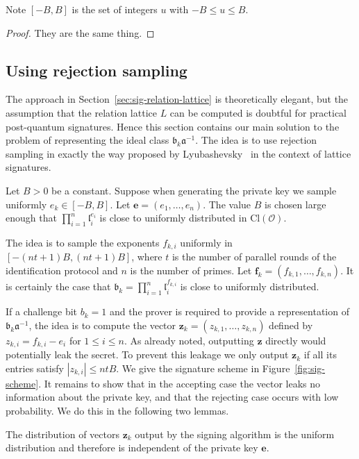\documentclass{llncs}
\newcommand{\OO}{\mathcal{O}}
\newcommand{\Cl}{\text{Cl}}
\renewcommand{\a}{\mathfrak{a}}
\renewcommand{\b}{\mathfrak{b}}
\renewcommand{\l}{\mathfrak{l}}
\newcommand{\e}{\textbf{e}}
\newcommand{\f}{\textbf{f}}
\newcommand{\z}{\textbf{z}}
\begin{document}
Note $[-B,B]$ is the set of integers $u$ with $-B \le u \le B$.


\begin{proof}
They are the same thing.
\end{proof}



\subsection{Using rejection sampling}\label{sec:sig-reject-sample}



The approach in Section~\ref{sec:sig-relation-lattice} is theoretically elegant, but the assumption that the relation lattice $L$ can be computed is doubtful for practical post-quantum signatures.
Hence this section contains our main solution to the problem of representing the ideal class $\b_k \a^{-1}$.
The idea is to use rejection sampling in exactly the way proposed by Lyubashevsky~\cite{Lyu09} in the context of lattice signatures.

Let $B > 0$ be a constant. Suppose when generating the private key we sample uniformly $e_k \in [-B, B]$. Let $\e = ( e_1, \dots, e_n )$.
The value $B$ is chosen large enough that $\prod_{i=1}^n \l_i^{e_i}$ is close to uniformly distributed in $\Cl(\OO)$.

The idea is to sample the exponents $f_{k,i}$ uniformly in $[-(nt+1)B, (nt+1)B]$, where $t$ is the number of parallel rounds of the identification protocol and $n$ is the number of primes.
Let $\f_k = (f_{k,1}, \dots, f_{k,n} )$.
It is certainly the case that $\b_k = \prod_{i=1}^n \l_i^{f_{k,i}}$ is close to uniformly distributed.

If a challenge bit $b_k = 1$ and the prover is required to provide a representation of $\b_k \a^{-1}$, the idea is to compute the vector $\z_k = (z_{k,1}, \dots, z_{k,n}) $ defined by $z_{k,i} = f_{k,i} - e_i $ for $1 \le i \le n$.
As already noted, outputting $\z$ directly would potentially leak the secret.
To prevent this leakage we only output $\z_k$ if all its entries satisfy $| z_{k,i} | \le nt B$.
We give the signature scheme in Figure~\ref{fig:sig-scheme}.
It remains to show that in the accepting case the vector leaks no information about the private key, and that the rejecting case occurs with low probability. We do this in the following two lemmas.

\begin{lemma} \label{lem:sim2}
The distribution of vectors $\z_k$ output by the signing algorithm is the uniform distribution and therefore is independent of the private key $\e$.
\end{lemma}
\end{document}
